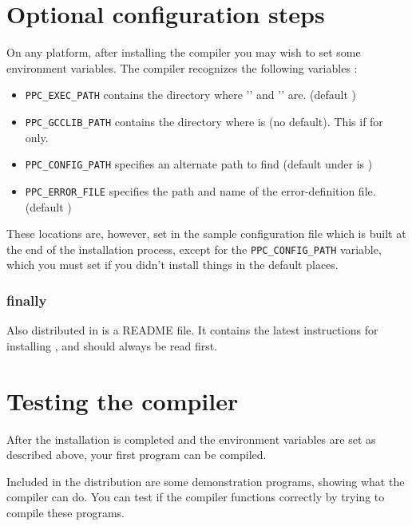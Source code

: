 \documentclass{book}
\begin{document}
\section{Optional configuration steps}
On any platform, after installing the compiler you may wish to set
some environment variables. The \fpc compiler
recognizes the following variables :
\begin{itemize}
\item \verb|PPC_EXEC_PATH| contains the directory where '' and
'' are. (default )
\item \verb|PPC_GCCLIB_PATH| contains the directory where 
is (no default). This if for \linux only.
\item \verb|PPC_CONFIG_PATH| specifies an alternate path to find
 (default under \linux is )
\item \verb|PPC_ERROR_FILE|  specifies the path and name of the error-definition file.
                  (default )
\end{itemize}

These locations are, however, set in the sample configuration file which is
built at the end of the installation process, except for the
\verb|PPC_CONFIG_PATH| variable, which you must set if you didn't install
things in the default places.
\subsubsection{finally}
Also distributed in \fpc is a README file. It contains the latest
instructions for installing \fpc, and should always be read first.


\section{Testing the compiler}
After the installation is completed and the environment variables are
set as described above, your first program can be compiled.

Included in the \fpc distribution are some demonstration programs,
showing what the compiler can do.
You can test if the compiler functions correctly by trying to compile
these programs.
\end{document}
